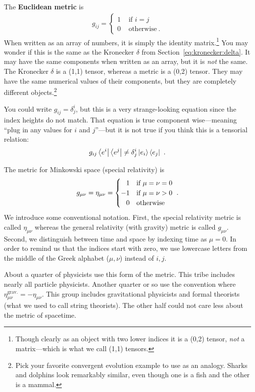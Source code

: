 \documentclass[12pt, oneside]{report}    %
\begin{document}
\begin{example}
The \textbf{Euclidean metric} is
\begin{align}
    g_{ij} = 
    \begin{cases}
        1 &\text{ if } i = j \\
        0 &\text{ otherwise} \ .
    \end{cases}
    \label{eq:metric:euclidean}
\end{align}
When written as an array of numbers, it is simply the identity matrix.\footnote{Though clearly as an object with two lower indices it is a (0,2) tensor, \emph{not} a matrix---which is what we call (1,1) tensors.}
You may wonder if this is the same as the Kronecker $\delta$ from Section~\ref{eq:kronecker:delta}. It may have the same components when written as an array, but it is \emph{not} the same. The Kronecker $\delta$ is a (1,1) tensor, whereas a metric is a (0,2) tensor. They may have the same numerical values of their components, but they are completely different objects.\footnote{Pick your favorite convergent evolution example to use as an analogy. Sharks and dolphins look remarkably similar, even though one is a fish and the other is a mammal.} 

You could write $g_{ij} = \delta^i_j$, but this is a very strange-looking equation since the index heights do not match. That equation is true component wise---meaning ``plug in any values for $i$ and $j$''---but it is not true if you think this is a tensorial relation:
\begin{align}
    g_{ij}\left\langle e^i\right|\left\langle e^j\right| \neq \delta^i_j \left|e_i\right\rangle\left\langle e_j\right| \ .
\end{align}
\end{example}

\begin{example}\label{eg:Minkowski:metric}
The metric for Minkowski space (special relativity) is
\begin{align}
    g_{\mu\nu} = \eta_{\mu\nu}
    =
    \begin{cases}
    \pp 1 & \text{if } \mu=\nu = 0\\
    -1 & \text{if } \mu=\nu > 0\\
    \pp 0 & \text{otherwise}
    \end{cases} \ .
    \label{eq:Minkowski:metric}
\end{align}
We introduce some conventional notation. First, the special relativity metric is called $\eta_{\mu\nu}$ whereas the general relativity (with gravity) metric is called $g_{\mu\nu}$. Second, we distinguish between time and space by indexing time as $\mu=0$. In order to remind us that the indices start with zero, we use lowercase letters from the middle of the Greek alphabet ($\mu, \nu$) instead of $i,j$.

About a quarter of physicists use this form of the metric. This tribe includes nearly all particle physicists. Another quarter or so use the convention where $\eta_{\mu\nu}^\text{grav.} = -\eta_{\mu\nu}$. This group includes gravitational physicists and formal theorists (what we used to call string theorists). The other half could not care less about the metric of spacetime. 
\end{example}
\end{document}
